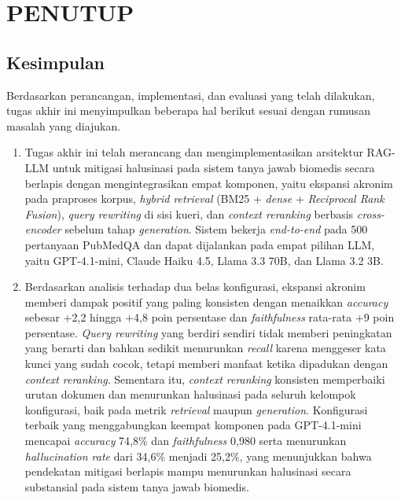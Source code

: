 \cleardoublepage
\chapter{PENUTUP}
\label{chap:penutup}

\section{Kesimpulan}
\label{sec:kesimpulan}

Berdasarkan perancangan, implementasi, dan evaluasi yang telah dilakukan, tugas akhir ini menyimpulkan beberapa hal berikut sesuai dengan rumusan masalah yang diajukan.

\begin{enumerate}[1.]
    \item Tugas akhir ini telah merancang dan mengimplementasikan arsitektur RAG-LLM untuk mitigasi halusinasi pada sistem tanya jawab biomedis secara berlapis dengan mengintegrasikan empat komponen, yaitu ekspansi akronim pada praproses korpus, \textit{hybrid retrieval} (BM25 + \textit{dense} + \textit{Reciprocal Rank Fusion}), \textit{query rewriting} di sisi kueri, dan \textit{context reranking} berbasis \textit{cross-encoder} sebelum tahap \textit{generation}. Sistem bekerja \textit{end-to-end} pada 500 pertanyaan PubMedQA dan dapat dijalankan pada empat pilihan LLM, yaitu GPT-4.1-mini, Claude Haiku 4.5, Llama 3.3 70B, dan Llama 3.2 3B.

    \item Berdasarkan analisis terhadap dua belas konfigurasi, ekspansi akronim memberi dampak positif yang paling konsisten dengan menaikkan \textit{accuracy} sebesar +2{,}2 hingga +4{,}8 poin persentase dan \textit{faithfulness} rata-rata +9 poin persentase. \textit{Query rewriting} yang berdiri sendiri tidak memberi peningkatan yang berarti dan bahkan sedikit menurunkan \textit{recall} karena menggeser kata kunci yang sudah cocok, tetapi memberi manfaat ketika dipadukan dengan \textit{context reranking}. Sementara itu, \textit{context reranking} konsisten memperbaiki urutan dokumen dan menurunkan halusinasi pada seluruh kelompok konfigurasi, baik pada metrik \textit{retrieval} maupun \textit{generation}. Konfigurasi terbaik yang menggabungkan keempat komponen pada GPT-4.1-mini mencapai \textit{accuracy} 74{,}8\% dan \textit{faithfulness} 0{,}980 serta menurunkan \textit{hallucination rate} dari 34{,}6\% menjadi 25{,}2\%, yang menunjukkan bahwa pendekatan mitigasi berlapis mampu menurunkan halusinasi secara substansial pada sistem tanya jawab biomedis.
\end{enumerate}

